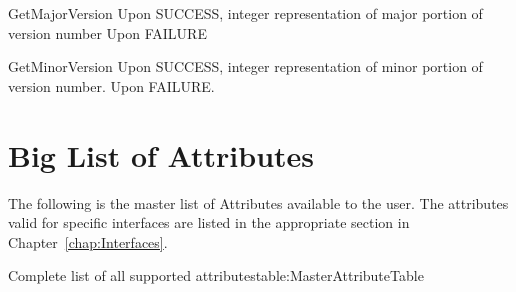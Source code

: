 \begin{prototype}{GetMajorVersion}
	 		{Upon SUCCESS, integer representation of major portion of version number}
	 	{Upon FAILURE}
\end{prototype}
\begin{prototype}{GetMinorVersion}
	             {Upon SUCCESS, integer representation of minor portion of version number.}
	 {Upon FAILURE.}
\end{prototype}

\section{Big List of Attributes}\label{sec:BLOA}

The following is the master list of Attributes available to the user.
The attributes valid for specific interfaces are listed in the appropriate section in Chapter~\ref{chap:Interfaces}. 

\begin{attributetable}{Complete list of all supported attributes}{table:MasterAttributeTable}
\aPstateDesc
\aCstateDesc
\aCstateLimitDesc
\aSstateDesc
\aCurrentDesc
\aVoltageDesc
\aPowerDesc
\aMinPowerDesc
\aMaxPowerDesc
\aFreqDesc
\aFreqLimitMinDesc
\aFreqLimitMaxDesc
\aEnergyDesc
\aTempDesc
\aOSIdDesc
\aThrottledIdDesc
\aThrottledCountIdDesc
\aGovDesc
\aWaterFlowDesc
\aDewPointDesc
\aHumidityDesc
\aPumpSpeedDesc
\aPressureDiffDesc
\aValvePositionDesc
\end{attributetable}

